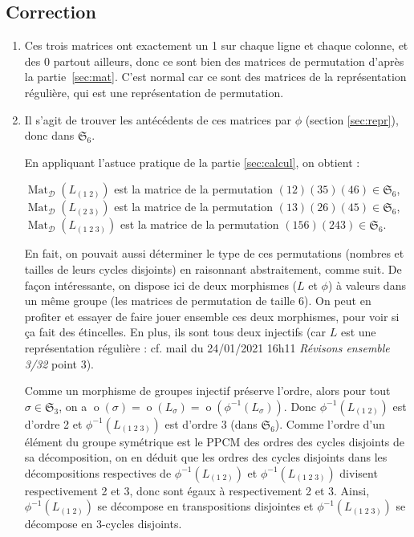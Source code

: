 \documentclass[10pt,a4paper,french,landscape]{article}
\theoremstyle{definition}
\theoremstyle{remark}
\DeclareMathOperator{\ord}{o}
\DeclareMathOperator{\M}{Mat}
\newcommand{\Sy}{\mathfrak{S}}
\newcommand{\1}{\mathbbm{1}}
\newcommand{\Sn}[1][n]{\Sy_{#1}}
\newcommand{\ba}[1]{\mathcal{#1}}
\begin{document}
\begin{multicols*}{2}
\section{Correction}

\begin{enumerate}

\item Ces trois matrices ont exactement un 1 sur chaque ligne et chaque colonne, et des 0 partout ailleurs, donc ce sont bien des matrices de permutation d'après la partie~\ref{sec:mat}. C'est normal car ce sont des matrices de la représentation régulière, qui est une représentation de permutation.

\item Il s'agit de trouver les antécédents de ces matrices par $\phi$ (section \ref{sec:repr}), donc dans $\Sn[6]$.

En appliquant l'astuce pratique de la partie \ref{sec:calcul}, on obtient :

$\M_\ba{D}(L_{(1\; 2)})$ est la matrice de la permutation $(1 2)(3 5)(4 6)\in\Sn[6]$,\\
$\M_\ba{D}(L_{(2\; 3)})$ est la matrice de la permutation $(1 3)(2 6)(4 5)\in\Sn[6]$,\\
$\M_\ba{D}(L_{(1\; 2\; 3)})$ est la matrice de la permutation $(1 5 6)(2 4 3)\in\Sn[6]$.

En fait, on pouvait aussi déterminer le type de ces permutations (nombres et tailles de leurs cycles disjoints) en raisonnant abstraitement, comme suit.
De façon intéressante, on dispose ici de deux morphismes ($L$ et $\phi$) à valeurs dans un même groupe (les matrices de permutation de taille 6). On peut en profiter et essayer de faire jouer ensemble ces deux morphismes, pour voir si ça fait des étincelles. En plus, ils sont tous deux injectifs (car $L$ est une représentation régulière : cf. mail du 24/01/2021 16h11 \textit{Révisons ensemble 3/32} point 3).\smallskip

Comme un morphisme de groupes injectif préserve l'ordre, alors pour tout $\sigma\in\Sn[3]$, on a $\ord(\sigma)=\ord(L_\sigma)=\ord(\phi^{-1}(L_\sigma))$. Donc $\phi^{-1}(L_{(1\; 2)})$ est d'ordre 2 et $\phi^{-1}(L_{(1\; 2\; 3)})$ est d'ordre 3 (dans $\Sn[6]$). Comme l'ordre d'un élément du groupe symétrique est le PPCM des ordres des cycles disjoints de sa décomposition, on en déduit que les ordres des cycles disjoints dans les décompositions respectives de $\phi^{-1}(L_{(1\; 2)})$ et $\phi^{-1}(L_{(1\; 2\; 3)})$ divisent respectivement 2 et 3, donc sont égaux à respectivement 2 et 3. Ainsi, $\phi^{-1}(L_{(1\; 2)})$ se décompose en transpositions disjointes et $\phi^{-1}(L_{(1\; 2\; 3)})$ se décompose en 3-cycles disjoints.
\smallskip


\end{enumerate}
\end{multicols*}
\end{document}
